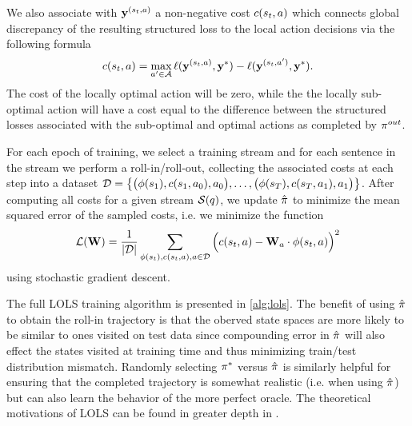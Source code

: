 We also associate with $\mathbf{y}^{(s_t, a)}$
a non-negative cost $c(s_t, a)$ which connects 
global discrepancy of the resulting structured loss to the local action
decisions via the following formula
\[
    c(s_t, a) = 
      \max_{a^\prime \in \mathcal{A}}
        \ell(
            \mathbf{y}^{(s_t, a)},
            \mathbf{y}^*)
        - 
        \ell(
            \mathbf{y}^{(s_t, a^\prime)},
            \mathbf{y}^*).
\]
The cost of the locally optimal action will be zero, while the 
the locally sub-optimal action will have a cost equal to the difference
between the structured losses associated with the sub-optimal and optimal 
actions as completed by $\pi^{out}$.

For each epoch of training, we select a training stream and for 
each sentence in the stream we perform a roll-in/roll-out, collecting
the associated costs at each step into a dataset
$\mathcal{D} = \big\{\big(\phi(s_1), c(s_1, a_0), a_0\big), \ldots,
\big(\phi(s_T), c(s_T, a_1), a_1\big) \big\}$.
After computing all costs for a given
stream $\mathcal{S}(q)$, we update $\hat{\pi}$ to minimize the mean
squared error of the sampled costs, i.e. we minimize the function
\[ 
    \mathcal{L}(\mathbf{W}) =
    \frac{1}{|\mathcal{D}|} \sum_{\phi(s_t), c(s_t, a), a \in \mathcal{D}}  
\Big( c(s_t, a) -  \mathbf{W}_{a} \cdot \phi(s_t, a) \Big)^2 \]
using stochastic gradient descent. 



The full LOLS training algorithm is presented in \autoref{alg:lols}.
The benefit of using $\hat{\pi}$ to obtain the roll-in trajectory 
is that the oberved state spaces are more likely to be similar to ones visited
on test data since compounding error in $\hat{\pi}$ will also effect the 
states visited at training 
time and thus minimizing train/test distribution mismatch. 
Randomly selecting $\pi^{*}$ versus $\hat{\pi}$ is similarly 
helpful for ensuring that the completed trajectory is somewhat realistic
(i.e. when using $\hat{\pi}$) but can also learn the behavior 
of the more perfect oracle. The theoretical motivations of LOLS can be found
in greater depth in \cite{chang2015learning}.


